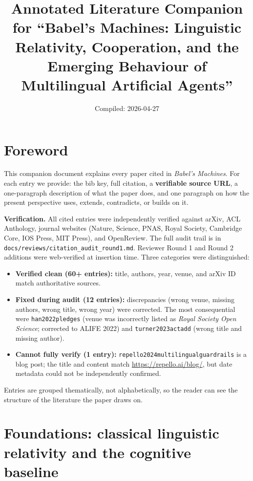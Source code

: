 \documentclass[11pt,a4paper]{article}
\title{\textbf{Annotated Literature Companion}\\\large for ``Babel's Machines: Linguistic Relativity, Cooperation, and the Emerging Behaviour of Multilingual Artificial Agents''}
\author{Compiled: 2026-04-27}
\date{}
\begin{document}
\maketitle

\section*{Foreword}

This companion document explains every paper cited in \emph{Babel's Machines}. For each entry we provide: the bib key, full citation, a \textbf{verifiable source URL}, a one-paragraph description of what the paper does, and one paragraph on how the present perspective uses, extends, contradicts, or builds on it.

\textbf{Verification.} All cited entries were independently verified against arXiv, ACL Anthology, journal websites (Nature, Science, PNAS, Royal Society, Cambridge Core, IOS Press, MIT Press), and OpenReview. The full audit trail is in \texttt{docs/reviews/citation\_audit\_round1.md}. Reviewer Round 1 and Round 2 additions were web-verified at insertion time. Three categories were distinguished:

\begin{itemize}
  \item \textbf{Verified clean (60+ entries):} title, authors, year, venue, and arXiv ID match authoritative sources.
  \item \textbf{Fixed during audit (12 entries):} discrepancies (wrong venue, missing authors, wrong title, wrong year) were corrected. The most consequential were \texttt{han2022pledges} (venue was incorrectly listed as \emph{Royal Society Open Science}; corrected to ALIFE 2022) and \texttt{turner2023actadd} (wrong title and missing author).
  \item \textbf{Cannot fully verify (1 entry):} \texttt{repello2024multilingualguardrails} is a blog post; the title and content match \url{https://repello.ai/blog/}, but date metadata could not be independently confirmed.
\end{itemize}

Entries are grouped thematically, not alphabetically, so the reader can see the structure of the literature the paper draws on.

\tableofcontents

\section{Foundations: classical linguistic relativity and the cognitive baseline}
\end{document}
